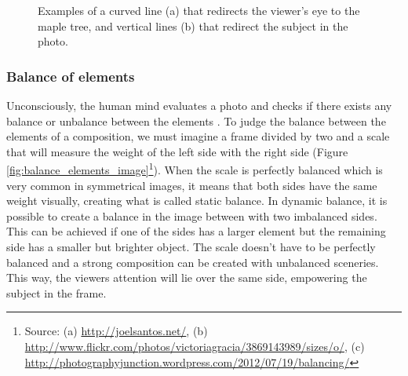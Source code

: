 \begin{figure}[htbp]
        \centering
  \caption{Examples of a curved line (a) that redirects the viewer's eye to the maple tree, and vertical lines (b) that redirect the subject in the photo.}
  \label{fig:leading_lines_image}
\end{figure}

\subsubsection{Balance of elements}
\label{subsub:balance_elements}

Unconsciously, the human mind evaluates a photo and checks if there exists any balance or unbalance between the elements \cite{Santos}.
To judge the balance between the elements of a composition, we must imagine a frame divided by two and a scale that will measure the weight of the left side with the right side (Figure \ref{fig:balance_elements_image}\footnote{Source: (a) \url{http://joelsantos.net/}, (b) \url{http://www.flickr.com/photos/victoriagracia/3869143989/sizes/o/}, (c) \url{http://photographyjunction.wordpress.com/2012/07/19/balancing/}
}).
When the scale is perfectly balanced which is very common in symmetrical images, it means that both sides have the same weight visually, creating what is called static balance.
In dynamic balance, it is possible to create a balance in the image between with two imbalanced sides. This can be achieved if one of the sides has a larger element but the remaining side has a smaller but brighter object.
The scale doesn't have to be perfectly balanced and a strong composition can be created with unbalanced sceneries. This way, the viewers attention will lie over the same side, empowering the subject in the frame.


